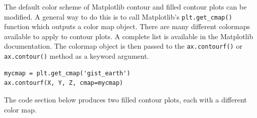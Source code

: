 \documentclass{book}
\begin{document}
    
        The default color scheme of Matplotlib contour and filled contour plots
can be modified. A general way to do this is to call Matplotlib's
\lstinline!plt.get_cmap()! function which outputs a color map object.
There are many different colormaps available to apply to contour plots.
A complete list is available in the Matplotlib documentation. The
colormap object is then passed to the \lstinline!ax.contourf()! or
\lstinline!ax.contour()! method as a keyword argument.

\begin{lstlisting}
mycmap = plt.get_cmap('gist_earth')
ax.contourf(X, Y, Z, cmap=mycmap)
\end{lstlisting}

The code section below produces two filled contour plots, each with a
different color map.
    
\end{document}
